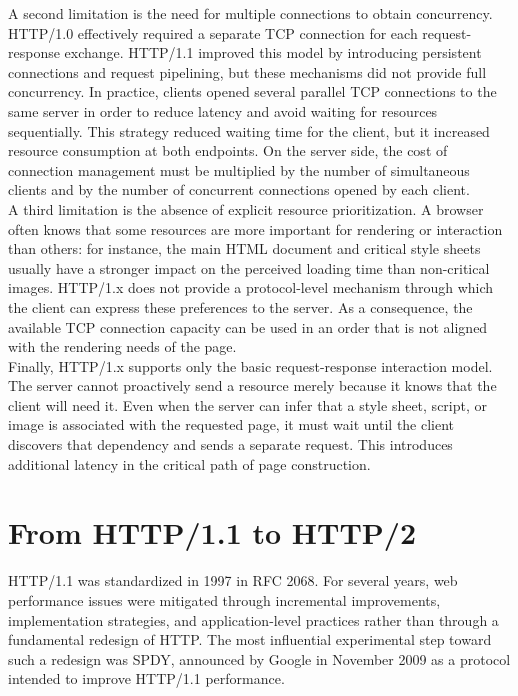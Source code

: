 \documentclass{scrbook}
\begin{document}
A second limitation is the need for multiple connections to obtain concurrency. HTTP/1.0 effectively required a separate TCP connection for each request-response exchange. HTTP/1.1 improved this model by introducing persistent connections and request pipelining, but these mechanisms did not provide full concurrency. In practice, clients opened several parallel TCP connections to the same server in order to reduce latency and avoid waiting for resources sequentially. This strategy reduced waiting time for the client, but it increased resource consumption at both endpoints. On the server side, the cost of connection management must be multiplied by the number of simultaneous clients and by the number of concurrent connections opened by each client.\\

A third limitation is the absence of explicit resource prioritization. A browser often knows that some resources are more important for rendering or interaction than others: for instance, the main HTML document and critical style sheets usually have a stronger impact on the perceived loading time than non-critical images. HTTP/1.x does not provide a protocol-level mechanism through which the client can express these preferences to the server. As a consequence, the available TCP connection capacity can be used in an order that is not aligned with the rendering needs of the page.\\

Finally, HTTP/1.x supports only the basic request-response interaction model. The server cannot proactively send a resource merely because it knows that the client will need it. Even when the server can infer that a style sheet, script, or image is associated with the requested page, it must wait until the client discovers that dependency and sends a separate request. This introduces additional latency in the critical path of page construction.

\section{From HTTP/1.1 to HTTP/2}

HTTP/1.1 was standardized in 1997 in RFC 2068. For several years, web performance issues were mitigated through incremental improvements, implementation strategies, and application-level practices rather than through a fundamental redesign of HTTP. The most influential experimental step toward such a redesign was SPDY, announced by Google in November 2009 as a protocol intended to improve HTTP/1.1 performance.\\
\end{document}
